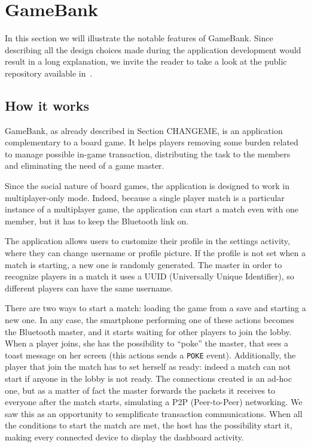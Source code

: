 \section{GameBank}

In this section we will illustrate the notable features of GameBank. Since 
describing all the design choices made during the application development would 
result in a long explanation, we invite the reader to take a look at the public 
repository available in~\cite{gamebank18}.

\subsection{How it works}

GameBank, as already described in Section CHANGEME,  is an application complementary to a board game. It helps players 
removing some burden related to manage possible in-game transaction, 
distributing the task to the members and eliminating the need of a game master.

Since the social nature of board games, the application is designed to work 
in multiplayer-only mode. Indeed, because a single player match is a particular 
instance of a multiplayer game, the application can start a match even with one 
member, but it has to keep the Bluetooth link on.

The application allows users to customize their profile in the settings 
activity, where they can change username or profile picture. If the profile is 
not set when a match is starting, a new one is randomly generated. The master 
in order to recognize players in a match it uses a UUID (Universally Unique 
Identifier), so different players can have the same username.

There are two ways to start a match: loading the game from a save and starting 
a new one. In any case, the smartphone performing one of these actions becomes 
the Bluetooth master, and it starts waiting for other players to join the 
lobby. When a player joins, she has the possibility to ``poke'' the master, 
that sees a toast message on her screen (this actions sends a \texttt{POKE} 
event). Additionally, the player that join the match has to set herself as 
ready: indeed a match can not start if anyone in the lobby is not ready. 
The connections created is an ad-hoc one, but as a matter of fact the master 
forwards the packets it receives to everyone after the match starts, simulating 
a P2P (Peer-to-Peer) networking. We saw this as an opportunity to semplificate 
transaction communications.
When all the conditions to start the match are met, the host has the 
possibility start it, making every connected device to display the dashboard 
activity.

